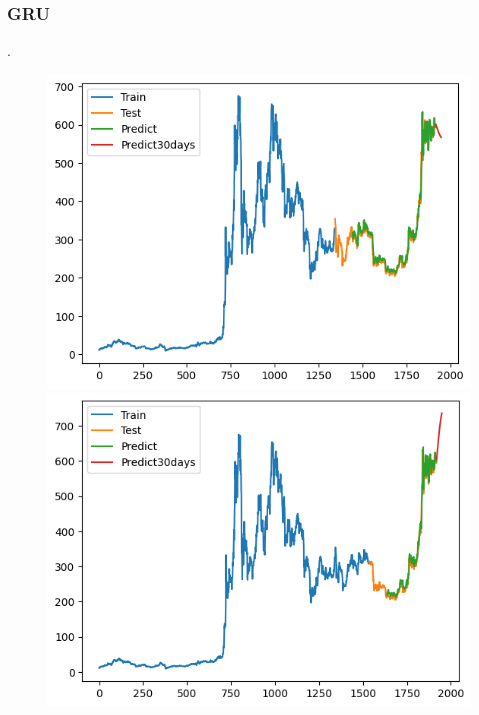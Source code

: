 \documentclass[conference]{IEEEtran}
\begin{document}
	\subsubsection{GRU}.
		\begin{figure}[H]
		\centering
		\begin{minipage}{0.15\textwidth}
			\centering
			\includegraphics[width=1\textwidth]{Figure/GRU_BNB_73.png}
		\end{minipage}
		\hfill
		\begin{minipage}{0.15\textwidth}
			\centering
			\includegraphics[width=1\textwidth]{Figure/GRU_BNB_82.png}
		\end{minipage}
		\hfill
		\begin{minipage}{0.15\textwidth}

\end{minipage}
\end{figure}
\end{document}
